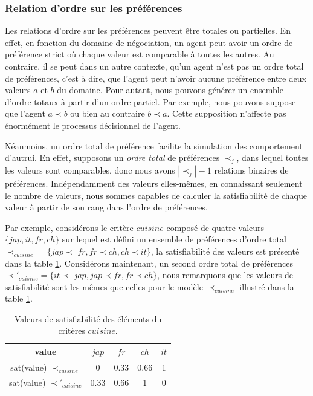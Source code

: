 \subsubsection{Relation d'ordre sur les préférences}
	Les relations d'ordre sur les préférences peuvent être totales ou partielles. En effet, en fonction du domaine de négociation, un agent peut avoir un ordre de préférence strict où chaque valeur est comparable à toutes les autres. Au contraire, il se peut dans un autre contexte, qu'un agent n'est pas un ordre total de préférences, c'est à dire, que l'agent peut n'avoir aucune préférence entre deux valeurs $a$ et $b$ du domaine. Pour autant, nous pouvons générer un ensemble d'ordre totaux à partir d'un ordre partiel. Par exemple, nous pouvons suppose que l'agent $a \prec b$ ou bien au contraire $b \prec a$. Cette supposition n'affecte pas énormément le processus décisionnel de l'agent. 
	
	Néanmoins, un ordre total de préférence facilite la simulation des comportement d'autrui. En effet, supposons un \textit{ordre total} de préférences $\prec_j$, dans lequel toutes les valeurs sont comparables, donc nous avons $|\prec_j| -1$ relations binaires de préférences. Indépendamment des valeurs elles-mêmes, en connaissant seulement le nombre de valeurs, nous sommes capables de calculer la satisfiabilité de chaque valeur à partir de son rang dans l'ordre de préférences.

	Par exemple, considérons le critère $cuisine$ composé de quatre valeurs $\{jap,it,fr,ch\}$ sur lequel est défini un ensemble de préférences d'ordre total $\prec_{cuisine} = \{jap$$\prec$ $fr, fr$$\prec$$ ch, ch$$\prec$$it\}$, la satisfiabilité des valeurs est présenté dans la table \ref{tab:ex2_sat}. Considérons maintenant, un second ordre total de préférences $\prec'_{cuisine} = \{it$$\prec$ $jap, jap$$\prec$$ fr, fr$$\prec$$ch\}$, nous remarquons que les valeurs de satisfiabilité sont les mêmes que celles pour le modèle $\prec_{cuisine}$ illustré dans la table \ref{tab:ex2_sat}. 


	\begin{table} [h]
		\centering
		\caption{Valeurs de satisfiabilité des éléments du critères $cuisine$.}
		\begin{tabular}{ |c|c|c|c|c| }
			\hline
			value & $jap$ & $fr$ & $ch$ & $it$ \\	
			\hline
			sat(value) $\prec_{cuisine}$ & 0 & 0.33 & 0.66 & 1 \\
			\hline
			sat(value) $\prec'_{cuisine}$ & 0.33 & 0.66 & 1 & 0 \\
			\hline
		\end{tabular}
		
		\label{tab:ex2_sat}
		
	\end{table}
	
